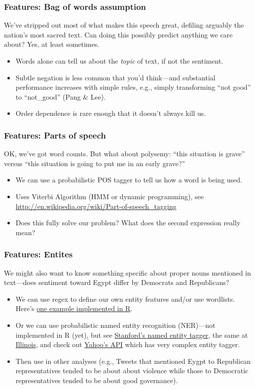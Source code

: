 \documentclass[]{beamer}
\begin{document}
\begin{frame}
  \frametitle{Features: Bag of words assumption}   %
  We've stripped out most of what makes this speech great, defiling arguably the nation's most sacred text.  Can doing this possibly predict anything we care about?  Yes, at least sometimes. 
  \begin{itemize}
  \item Words alone can tell us about the \emph{topic} of text, if not the sentiment.
  \item Subtle negation is less common that you'd think---and substantial performance increases with simple rules, e.g., simply transforming ``not good'' to ``not\_good'' (Pang \& Lee).
  \item Order dependence is rare enough that it doesn't always kill us.
  \end{itemize}
\end{frame}

\begin{frame}
  \frametitle{Features: Parts of speech}   %
  OK, we've got word counts.  But what about polysemy: ``this situation is grave'' versus ``this situation is going to put me in an early grave?''
  \begin{itemize}
  \item We can use a probabilistic POS tagger to tell us how a word is being used. 
  \item Uses Viterbi Algorithm (HMM or dynamic programming), see \url{http://en.wikipedia.org/wiki/Part-of-speech_tagging}
  \item Does this fully solve our problem?  What does the second expression really mean?
  \end{itemize}
\end{frame}

\begin{frame}
  \frametitle{Features: Entites}   %
  We might also want to know something specific about proper nouns mentioned in text---does sentiment toward Egypt differ by Democrats and Republicans?
  \begin{itemize}
  \item We can use regex to define our own entity features and/or use wordlists.  Here's \href{http://www.r-bloggers.com/tracking-us-sentiments-over-time-in-wikileaks/}{\color{blue} one example implemented in R}.
  \item Or we can use probabilistic named entity recognition (NER)---not implemented in R (yet), but see \href{http://nlp.stanford.edu/software/CRF-NER.shtml}{\color{blue} Stanford's named entity tagger}, the same at \href{http://cogcomp.cs.illinois.edu/page/software_view/4}{\color{blue} Illinois}, and check out \href{http://developer.yahoo.com/contentanalysis/}{\color{blue} Yahoo's API} which has very complex entity tagger.
  \item Then use in other analyses (e.g., Tweets that mentioned Eygpt to Republican representatives tended to be about about violence while those to Democratic representatives tended to be about good governance).  
  \end{itemize}
\end{frame}
\end{document}
